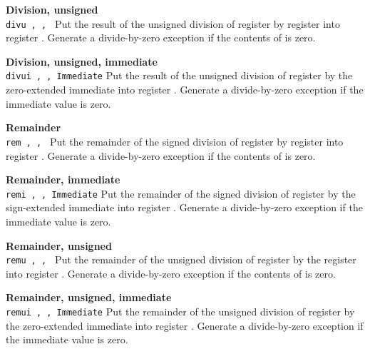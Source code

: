 \noindent
{\bf Division, unsigned}\\
\noindent
\texttt{divu \regd, \regs, \regt}
Put the result of the unsigned division of register \regs{} by register \regt{}
into register \regd{}. Generate a divide-by-zero exception if the contents of \regt{} is zero.
\vspace{3ex}
\newpage

\noindent
{\bf Division, unsigned, immediate}\\
\noindent
\texttt{divui \regd, \regs, Immediate}
Put the result of the unsigned division of register \regs{} by the zero-extended immediate
into register \regd{}. Generate a divide-by-zero exception if the immediate value is zero. 
\vspace{3ex}

\noindent
{\bf Remainder}\\
\noindent
\texttt{rem \regd, \regs, \regt}
Put the remainder of the signed division of register \regs{} by register \regt{}
into register \regd{}. Generate a divide-by-zero exception if the contents of \regt{} is zero.
\vspace{3ex}

\noindent
{\bf Remainder, immediate}\\
\noindent
\texttt{remi \regd, \regs, Immediate}
Put the remainder of the signed division of register \regs{} by the sign-extended immediate
into register \regd{}. Generate a divide-by-zero exception if the immediate value is zero.
\vspace{3ex}

\noindent
{\bf Remainder, unsigned}\\
\noindent
\texttt{remu \regd, \regs, \regt}
Put the remainder of the unsigned division of register \regs{} by the register \regt{}
into register \regd{}. Generate a divide-by-zero exception if the contents of \regt{} is zero.
\vspace{3ex}

\noindent
{\bf Remainder, unsigned, immediate}\\
\noindent
\texttt{remui \regd, \regs, Immediate}
Put the remainder of the unsigned division of register \regs{} by the zero-extended immediate
into register \regd{}. Generate a divide-by-zero exception if the immediate value is zero.
\vspace{3ex}

